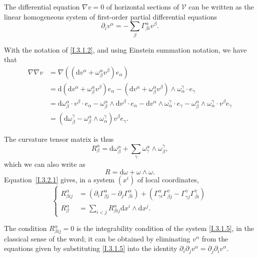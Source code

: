 \documentclass{report}
\theoremstyle{plain}
\theoremstyle{definition}
\newenvironment{env}[1]
    {\renewcommand\theinnercustomenv{#1}\innercustomenv}
    {\endinnercustomenv}
\newcommand{\sh}[1]{{\mathscr{#1}}}
\newcommand{\dd}{\mathrm{d}}
\newcommand{\oldpage}[1]{\marginpar{\footnotesize$\Big\vert$ \textit{p.~#1}}}
\begin{document}
\begin{env}{3.1}
  The differential equation $\nabla v=0$ of horizontal sections of $\sh{V}$ can be written as the linear homogeneous system of first-order partial differential equations
  \[
  \label{I.3.1.5}
    \partial_i v^\alpha = -\sum_\beta \Gamma_{\beta i}^\alpha v^\beta.
  \tag{3.1.5}
  \]
\end{env}

\begin{env}{3.2}
\label{I.3.2}
  With the notation of \cref{I.3.1.2}, and using Einstein summation notation, we have that
  \[
    \begin{aligned}
      \nabla\nabla v
      &= \nabla((\dd v^\alpha + \omega_\beta^\alpha v^\beta)e_\alpha)
    \\&= \dd(\dd v^\alpha + \omega_\beta^\alpha v^\beta)e_\alpha - (\dd v^\alpha + \omega_\beta^\alpha v^\beta)\wedge\omega_\alpha^\gamma\cdot e_\gamma
    \\&= \dd\omega_\beta^\alpha\cdot v^\beta\cdot e_\alpha - \omega_\beta^\alpha\wedge\dd v^\beta\cdot e_\alpha - \dd v^\alpha\wedge\omega_\alpha^\gamma\cdot e_\gamma - \omega_\beta^\alpha\wedge\omega_\alpha^\gamma\cdot v^\beta e_\gamma
    \\&= (\dd\omega_\beta^\gamma - \omega_\beta^\alpha\wedge\omega_\alpha^\gamma)v^\beta e_\gamma.
    \end{aligned}
  \]

  The curvature tensor matrix is thus
\oldpage{23}
  \[
  \label{I.3.2.1}
    R_\beta^\alpha = \dd\omega_\beta^\alpha + \sum_\gamma \omega_\gamma^\alpha\wedge\omega_\beta^\gamma,
  \tag{3.2.1}
  \]
  which we can also write as
  \[
  \label{I.3.2.2}
    R = \dd\omega + \omega\wedge\omega.
  \tag{3.2.2}
  \]
  Equation~\cref{I.3.2.1} gives, in a system $(x^i)$ of local coordinates,
  \[
  \label{I.3.2.3}
    \begin{cases}
      R_{\beta i j}^\alpha
      &= (\partial_i\Gamma_{\beta j}^\alpha - \partial_j\Gamma_{\beta i}^\alpha) + (\Gamma_{\gamma i}^\alpha\Gamma_{\beta j}^\gamma - \Gamma_{\gamma j}^\gamma\Gamma_{\beta i}^\gamma)
    \\R_\beta^\alpha
      &= \sum_{i<j} R_{\beta i j}^\alpha \dd x^i\wedge\dd x^j.
    \end{cases}
  \tag{3.2.3}
  \]

  The condition $R_{\beta i j}^\alpha = 0$ is the integrability condition of the system \cref{I.3.1.5}, in the classical sense of the word;
  it can be obtained by eliminating $v^\alpha$ from the equations given by substituting \cref{I.3.1.5} into the identity $\partial_i\partial_j v^\alpha = \partial_j\partial_i v^\alpha$.
\end{env}
\end{document}
